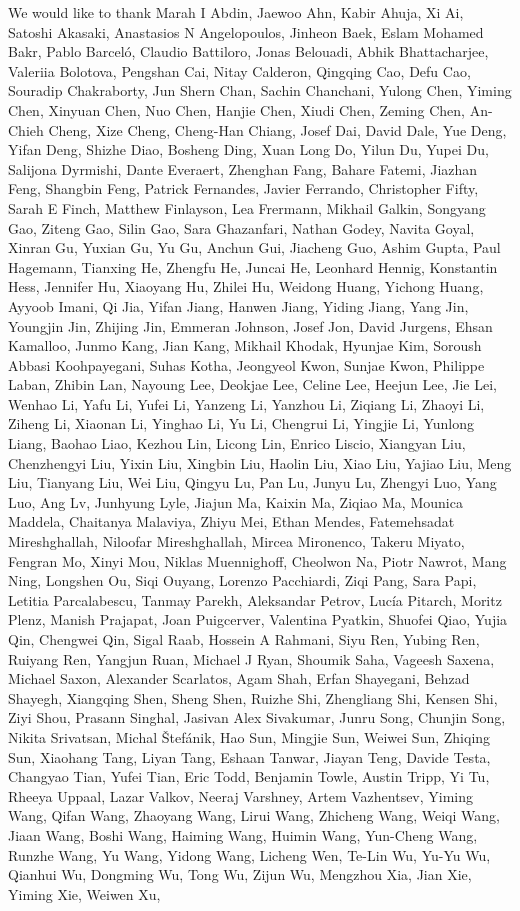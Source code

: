 We would like to thank Marah I Abdin, Jaewoo Ahn, Kabir Ahuja, Xi Ai, Satoshi Akasaki, Anastasios N Angelopoulos, Jinheon Baek, Eslam Mohamed Bakr, Pablo Barceló, Claudio Battiloro, Jonas Belouadi, Abhik Bhattacharjee, Valeriia Bolotova, Pengshan Cai, Nitay Calderon, Qingqing Cao, Defu Cao, Souradip Chakraborty, Jun Shern Chan, Sachin Chanchani, Yulong Chen, Yiming Chen, Xinyuan Chen, Nuo Chen, Hanjie Chen, Xiudi Chen, Zeming Chen, An-Chieh Cheng, Xize Cheng, Cheng-Han Chiang, Josef Dai, David Dale, Yue Deng, Yifan Deng, Shizhe Diao, Bosheng Ding, Xuan Long Do, Yilun Du, Yupei Du, Salijona Dyrmishi, Dante Everaert, Zhenghan Fang, Bahare Fatemi, Jiazhan Feng, Shangbin Feng, Patrick Fernandes, Javier Ferrando, Christopher Fifty, Sarah E Finch, Matthew Finlayson, Lea Frermann, Mikhail Galkin, Songyang Gao, Ziteng Gao, Silin Gao, Sara Ghazanfari, Nathan Godey, Navita Goyal, Xinran Gu, Yuxian Gu, Yu Gu, Anchun Gui, Jiacheng Guo, Ashim Gupta, Paul Hagemann, Tianxing He, Zhengfu He, Juncai He, Leonhard Hennig, Konstantin Hess, Jennifer Hu, Xiaoyang Hu, Zhilei Hu, Weidong Huang, Yichong Huang, Ayyoob Imani, Qi Jia, Yifan Jiang, Hanwen Jiang, Yiding Jiang, Yang Jin, Youngjin Jin, Zhijing Jin, Emmeran Johnson, Josef Jon, David Jurgens, Ehsan Kamalloo, Junmo Kang, Jian Kang, Mikhail Khodak, Hyunjae Kim, Soroush Abbasi Koohpayegani, Suhas Kotha, Jeongyeol Kwon, Sunjae Kwon, Philippe Laban, Zhibin Lan, Nayoung Lee, Deokjae Lee, Celine Lee, Heejun Lee, Jie Lei, Wenhao Li, Yafu Li, Yufei Li, Yanzeng Li, Yanzhou Li, Ziqiang Li, Zhaoyi Li, Ziheng Li, Xiaonan Li, Yinghao Li, Yu Li, Chengrui Li, Yingjie Li, Yunlong Liang, Baohao Liao, Kezhou Lin, Licong Lin, Enrico Liscio, Xiangyan Liu, Chenzhengyi Liu, Yixin Liu, Xingbin Liu, Haolin Liu, Xiao Liu, Yajiao Liu, Meng Liu, Tianyang Liu, Wei Liu, Qingyu Lu, Pan Lu, Junyu Lu, Zhengyi Luo, Yang Luo, Ang Lv, Junhyung Lyle, Jiajun Ma, Kaixin Ma, Ziqiao Ma, Mounica Maddela, Chaitanya Malaviya, Zhiyu Mei, Ethan Mendes, Fatemehsadat Mireshghallah, Niloofar Mireshghallah, Mircea Mironenco, Takeru Miyato, Fengran Mo, Xinyi Mou, Niklas Muennighoff, Cheolwon Na, Piotr Nawrot, Mang Ning, Longshen Ou, Siqi Ouyang, Lorenzo Pacchiardi, Ziqi Pang, Sara Papi, Letitia Parcalabescu, Tanmay Parekh, Aleksandar Petrov, Lucía Pitarch, Moritz Plenz, Manish Prajapat, Joan Puigcerver, Valentina Pyatkin, Shuofei Qiao, Yujia Qin, Chengwei Qin, Sigal Raab, Hossein A Rahmani, Siyu Ren, Yubing Ren, Ruiyang Ren, Yangjun Ruan, Michael J Ryan, Shoumik Saha, Vageesh Saxena, Michael Saxon, Alexander Scarlatos, Agam Shah, Erfan Shayegani, Behzad Shayegh, Xiangqing Shen, Sheng Shen, Ruizhe Shi, Zhengliang Shi, Kensen Shi, Ziyi Shou, Prasann Singhal, Jasivan Alex Sivakumar, Junru Song, Chunjin Song, Nikita Srivatsan, Michal Štefánik, Hao Sun, Mingjie Sun, Weiwei Sun, Zhiqing Sun, Xiaohang Tang, Liyan Tang, Eshaan Tanwar, Jiayan Teng, Davide Testa, Changyao Tian, Yufei Tian, Eric Todd, Benjamin Towle, Austin Tripp, Yi Tu, Rheeya Uppaal, Lazar Valkov, Neeraj Varshney, Artem Vazhentsev, Yiming Wang, Qifan Wang, Zhaoyang Wang, Lirui Wang, Zhicheng Wang, Weiqi Wang, Jiaan Wang, Boshi Wang, Haiming Wang, Huimin Wang, Yun-Cheng Wang, Runzhe Wang, Yu Wang, Yidong Wang, Licheng Wen, Te-Lin Wu, Yu-Yu Wu, Qianhui Wu, Dongming Wu, Tong Wu, Zijun Wu, Mengzhou Xia, Jian Xie, Yiming Xie, Weiwen Xu, 